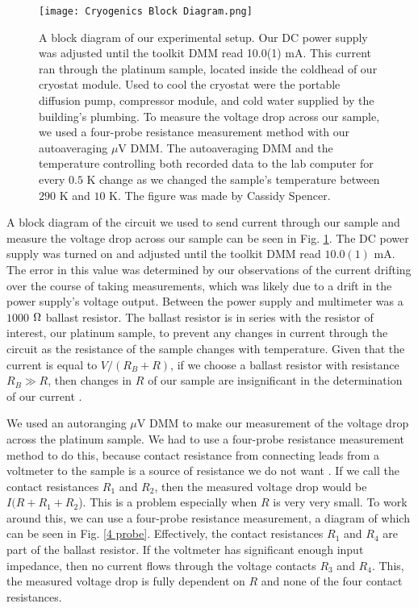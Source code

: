 \documentclass[11pt,letterpaper]{article}
\begin{document}
\begin{figure}
\centerline{\texttt{[image: Cryogenics Block Diagram.png]}}
\caption{A block diagram of our experimental setup. Our DC power supply was adjusted until the toolkit DMM read 10.0(1) mA. This current ran through the platinum sample, located inside the coldhead of our cryostat module. Used to cool the cryostat were the portable diffusion pump, compressor module, and cold water supplied by the building's plumbing. To measure the voltage drop across our sample, we used a four-probe resistance measurement method with our autoaveraging $\mu$V DMM. The autoaveraging DMM and the temperature controlling both recorded data to the lab computer for every $0.5$ K change as we changed the sample's temperature between $290$ K and $10$ K. The figure was made by Cassidy Spencer.} \label{Block diagram}
\end{figure}

A block diagram of the circuit we used to send current through our sample and measure the voltage drop across our sample can be seen in Fig. \ref{Block diagram}. The DC power supply was turned on and adjusted until the toolkit DMM read $10.0(1)$ mA. The error in this value was determined by our observations of the current drifting over the course of taking measurements, which was likely due to a drift in the power supply's voltage output. Between the power supply and multimeter was a $1000$ $\ohm$ ballast resistor. The ballast resistor is in series with the resistor of interest, our platinum sample, to prevent any changes in current through the circuit as the resistance of the sample changes with temperature. Given that the current is equal to $V / (R_B + R)$, if we choose a ballast resistor with resistance $R_B \gg R$, then changes in $R$ of our sample are insignificant in the determination of our current \cite{Scofield}. 

We used an autoranging $\mu$V DMM to make our measurement of the voltage drop across the platinum sample. We had to use a four-probe resistance measurement method to do this, because contact resistance from connecting leads from a voltmeter to the sample is a source of resistance we do not want \cite{Scofield}. If we call the contact resistances $R_1$ and $R_2$, then the measured voltage drop would be $I(R + R_1 + R_2$). This is a problem especially when $R$ is very very small. To work around this, we can use a four-probe resistance measurement, a diagram of which can be seen in Fig. \ref{4 probe}. Effectively, the contact resistances $R_1$ and $R_4$ are part of the ballast resistor. If the voltmeter has significant enough input impedance, then no current flows through the voltage contacts $R_3$ and $R_4$. This, the measured voltage drop is fully dependent on $R$ and none of the four contact resistances.
\end{document}
